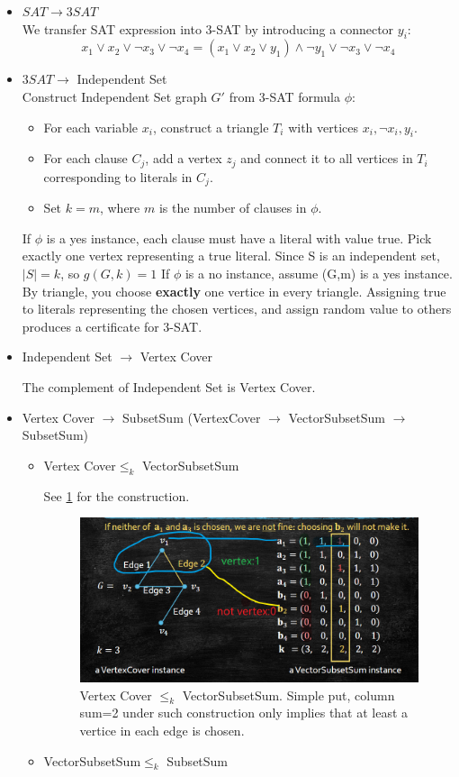 \begin{itemize}
\item $SAT\rightarrow 3SAT$\\
    We transfer SAT expression into 3-SAT by introducing a connector $y_i$:
\[x_1 \lor x_2 \lor \neg x_3 \lor \neg x_4= (x_1 \lor x_2 \lor y_1) \land \neg y_1 \lor \neg x_3 \lor \neg x_4\]
\item $3SAT\rightarrow$ Independent Set\\
    Construct Independent Set graph $G'$ from 3-SAT formula $\phi$:
    \begin{itemize}
        \item For each variable $x_i$, construct a triangle $T_i$ with vertices $x_i, \neg x_i, y_i$.
        \item For each clause $C_j$, add a vertex $z_j$ and connect it to all vertices in $T_i$ corresponding to literals in $C_j$.
        \item Set $k=m$, where $m$ is the number of clauses in $\phi$.
    \end{itemize}
    If $\phi$ is a yes instance, each clause must have a literal with value true. Pick exactly one vertex representing a true literal. Since S is an independent set, $|S|=k$, so $g(G,k)=1$
    If $\phi$ is a no instance, assume (G,m) is a yes instance. By triangle, you choose \textbf{exactly} one vertice in every triangle. Assigning true to literals representing the chosen vertices, and assign random value to others produces a certificate for 3-SAT.
\item Independent Set $\rightarrow$ Vertex Cover

    The complement of Independent Set is Vertex Cover. 
\item Vertex Cover $\rightarrow$ SubsetSum (VertexCover $\rightarrow$ VectorSubsetSum $\rightarrow$ SubsetSum)
\begin{itemize}
    \item Vertex Cover$\leq_k$ VectorSubsetSum 
    
    See \ref{fig:vertex_cover} for the construction.
        \begin{figure}
            \centering
            \includegraphics[width=0.6\linewidth]{Notes/fig/VSS.png}
            \caption{Vertex Cover $\leq_k$ VectorSubsetSum. Simple put, column sum=2 under such construction only implies that at least a vertice in each edge is chosen.}
            \label{fig:vertex_cover}
        \end{figure}
    \item VectorSubsetSum$\leq_k$ SubsetSum
    

\end{itemize}
\end{itemize}

